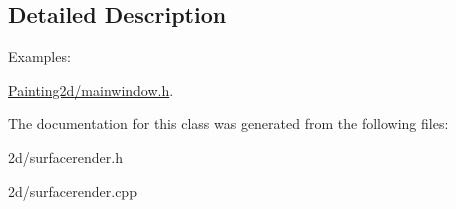 \subsection{Detailed Description}
\begin{Desc}
\item[Examples\+: ]\par
\hyperlink{_painting2d_2mainwindow_8h-example}{Painting2d/mainwindow.\+h}.\end{Desc}


The documentation for this class was generated from the following files\+:\begin{DoxyCompactItemize}
\item 
2d/surfacerender.\+h\item 
2d/surfacerender.\+cpp\end{DoxyCompactItemize}
